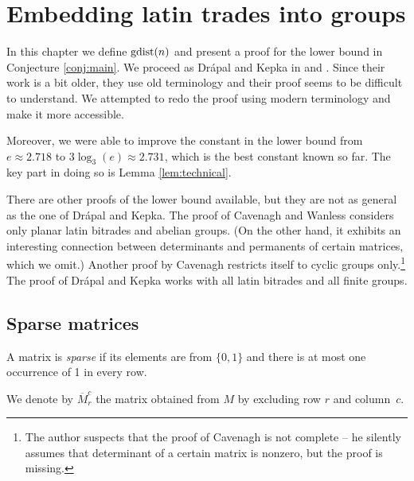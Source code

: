 \chapter{Embedding latin trades into groups}
\label{chap:lower-bound}

In this chapter we define $\mathop{\mathrm{gdist}}(n)$ and present a proof for the lower bound in Conjecture \ref{conj:main}. We proceed as Drápal and Kepka in \cite{DrapalKepka89} and \cite{DrapalKepka85}. Since their work is a bit older, they use old terminology and their proof seems to be difficult to understand. We attempted to redo the proof using modern terminology and make it more accessible.

Moreover, we were able to improve the constant in the lower bound from $e \approx 2.718$ to $3 \log_3(e) \approx 2.731$, which is the best constant known so far. The key part in doing so is Lemma \ref{lem:technical}.

There are other proofs of the lower bound available, but they are not as general as the one of Drápal and Kepka. The proof of Cavenagh and Wanless \cite{CavenaghWanless09} considers only planar latin bitrades and abelian groups. (On the other hand, it exhibits an interesting connection between determinants and permanents of certain matrices, which we omit.) Another proof by Cavenagh \cite{Cavenagh03} restricts itself to cyclic groups only.\footnote{The author suspects that the proof of Cavenagh is not complete -- he silently assumes that determinant of a certain matrix is nonzero, but the proof is missing.} The proof of Drápal and Kepka works with all latin bitrades and all finite groups.

\section{Sparse matrices}

\begin{defn}
A matrix is \emph{sparse} if its elements are from $\{0,1\}$ and there is at most one occurrence of 1 in every row.
\end{defn}

We denote by $\overbar{M}_r^c$ the matrix obtained from $M$ by excluding row $r$ and column~$c$.


